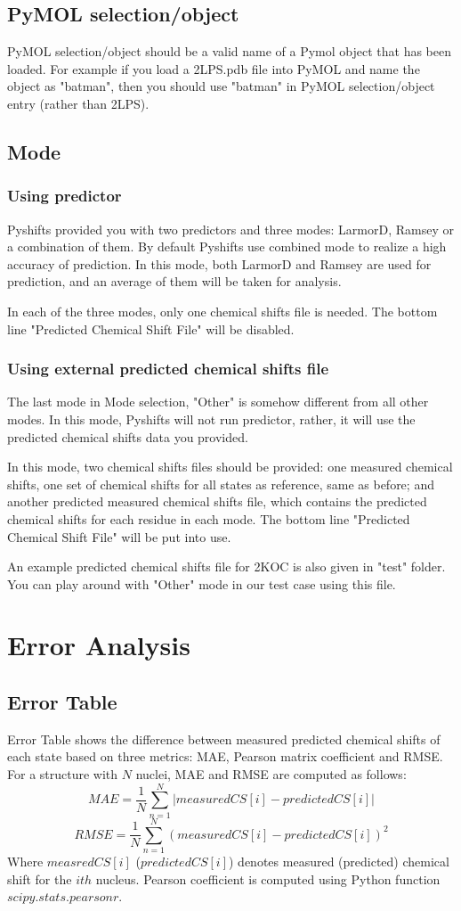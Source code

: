 \documentclass{article}
\begin{document}
\subsection{PyMOL selection/object}
PyMOL selection/object should be a valid name of a Pymol object that has been loaded. For example if you load a 2LPS.pdb file into PyMOL and name the object as "batman", then you should use "batman" in PyMOL selection/object entry (rather than 2LPS).
 
\subsection{Mode}
\subsubsection{Using predictor}
Pyshifts provided you with two predictors and three modes: LarmorD, Ramsey or a combination of them. By default Pyshifts use combined mode to realize a high accuracy of prediction. In this mode, both LarmorD and Ramsey are used for prediction, and an average of them will be taken for analysis.

In each of the three modes, only one chemical shifts file is needed. The bottom line "Predicted Chemical Shift File" will be disabled.
\subsubsection{Using external predicted chemical shifts file}
The last mode in Mode selection, "Other" is somehow different from all other modes. In this mode, Pyshifts will not run predictor, rather, it will use the predicted chemical shifts data you provided. 

In this mode, two chemical shifts files should be provided: one measured chemical shifts, one set of chemical shifts for all states as reference, same as before; and another predicted measured chemical shifts file, which contains the predicted chemical shifts for each residue in each mode. The bottom line "Predicted Chemical Shift File" will be put into use.

An example predicted chemical shifts file for 2KOC is also given in "test" folder. You can play around with "Other" mode in our test case using this file.

\newpage
\section{Error Analysis}
\subsection{Error Table}
Error Table shows the difference between measured predicted chemical shifts of each state based on three metrics: MAE, Pearson matrix coefficient and RMSE. For a structure with $N$ nuclei, MAE and RMSE are computed as follows:
$$MAE = \frac{1}{N}\sum_{n=1}^{N} |measuredCS[i]-predictedCS[i]|$$
$$RMSE = \frac{1}{N}\sum_{n=1}^{N} (measuredCS[i]-predictedCS[i])^2$$
Where $measredCS[i]$ ($predictedCS[i]$) denotes measured (predicted) chemical shift for the $ith$ nucleus.
Pearson coefficient is computed using Python function $scipy.stats.pearsonr$.
\end{document}
